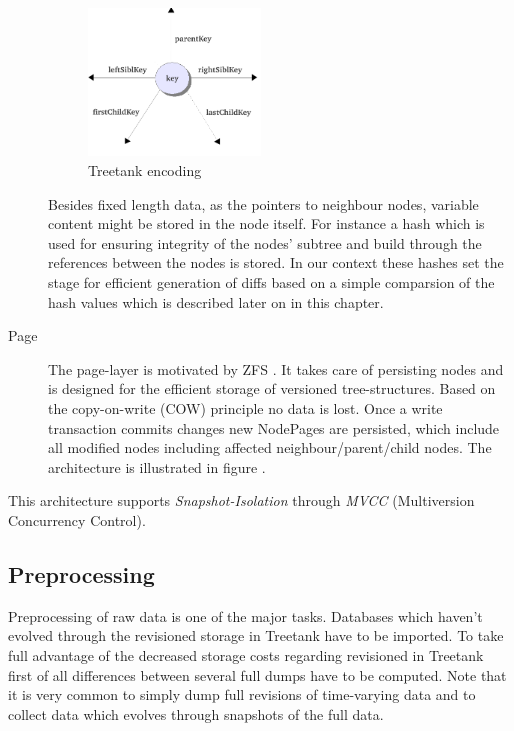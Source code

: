 \begin{description}
\begin{figure}[tb]
\centering
\includegraphics[width=0.45\textwidth]{figures/encoding}
\caption{Treetank encoding} 
\label{fig:encoding}
\end{figure}

Besides fixed length data, as the pointers to neighbour nodes, variable content might be stored in the node itself. For instance a hash which is used for ensuring integrity of the nodes' subtree and build through the references between the nodes is stored. In our context these hashes set the stage for efficient generation of diffs based on a simple comparsion of the hash values which is described later on in this chapter.

\item[Page] The page-layer is motivated by ZFS . It takes care of persisting nodes and is designed for the efficient storage of versioned tree-structures. Based on the copy-on-write (COW) principle no data is lost. Once a write transaction commits changes new NodePages are persisted, which include all modified nodes including affected neighbour/parent/child nodes. The architecture is illustrated in figure .
\end{description}

This architecture supports \emph{Snapshot-Isolation} through \emph{MVCC} (Multiversion Concurrency Control).

\subsection{Preprocessing}
Preprocessing of raw data is one of the major tasks. Databases which haven't evolved through the revisioned storage in Treetank have to be imported. To take full advantage of the decreased storage costs regarding revisioned in Treetank first of all differences between several full dumps have to be computed. Note that it is very common to simply dump full revisions of time-varying data and to collect data which evolves through snapshots of the full data.

